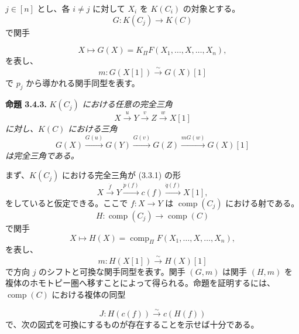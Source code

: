 \clearpage
{}%
\begingroup
\small
\setlength{\abovedisplayskip}{3pt plus 2pt minus 2pt}%
\setlength{\belowdisplayskip}{3pt plus 2pt minus 2pt}%
\setlength{\jot}{2pt}%

$j\in[n]$ とし、各 $i\neq j$ に対して $X_i$ を $K(C_i)$ の対象とする。
\[
  G\colon K(C_j)\longrightarrow K(C)
\]
で関手

\begingroup
\makeatletter
\tagsleft@true
\let\veqno\@@leqno
\makeatother
\begin{equation}
  X\longmapsto G(X)=K_{\Pi}F(X_1,\ldots,X,\ldots,X_n),
  \tag{3.4.2.1}
\end{equation}
\endgroup
{}
を表し、
\[
  m\colon G(X[1])\xrightarrow{\sim}G(X)[1]
\]
で $p_j$ から導かれる関手同型を表す。

\noindent\textbf{命題 3.4.3.}\quad
\emph{$K(C_j)$ における任意の完全三角}
\[
  X\xrightarrow{u}Y\xrightarrow{v}Z\xrightarrow{w}X[1]
\]
\emph{に対し、$K(C)$ における三角}
\[
  G(X)\xrightarrow{G(u)}G(Y)\xrightarrow{G(v)}G(Z)
  \xrightarrow{mG(w)}G(X)[1]
\]
\emph{は完全三角である。}

まず、$K(C_j)$ における完全三角が (3.3.1) の形
\[
  X\xrightarrow{\dot f}Y\xrightarrow{\dot p(f)}c(f)
  \xrightarrow{\dot q(f)}X[1],
\]
をしていると仮定できる。ここで $f\colon X\longrightarrow Y$ は
$\operatorname{comp}(C_j)$ における射である。
\[
  H\colon\operatorname{comp}(C_j)\longrightarrow\operatorname{comp}(C)
\]
で関手
\[
  X\longmapsto H(X)=\operatorname{comp}_{\Pi}F
  (X_1,\ldots,X,\ldots,X_n),
\]
を表し、
\[
  m\colon H(X[1])\xrightarrow{\sim}H(X)[1]
\]
で方向 $j$ のシフトと可換な関手同型を表す。関手 $(G,m)$ は関手 $(H,m)$
を複体のホモトピー圏へ移すことによって得られる。命題を証明するには、
$\operatorname{comp}(C)$ における複体の同型

\[
  J\colon H(c(f))\xrightarrow{\sim}c(H(f))
\]
で、次の図式を可換にするものが存在することを示せば十分である。

